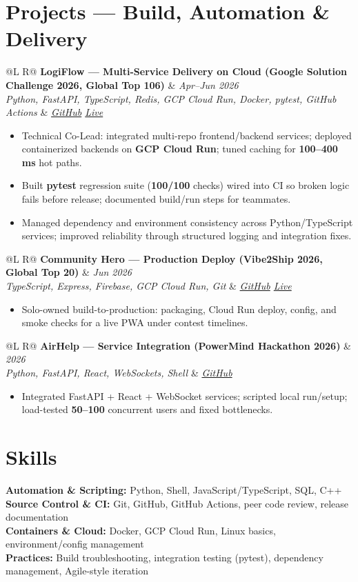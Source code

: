 \documentclass[a4paper,10pt]{article}
\makeatletter
\newcommand{\proj}[4]{%
  \vspace{1.5mm}
  \noindent\begin{tabularx}{\textwidth}{@{}L R@{}}
    \textbf{#1} & \textit{\small #2} \\
    \textit{\small #3} & \textit{\small #4} \\
  \end{tabularx}\par
  \vspace{0.5mm}%
}
\makeatother
\begin{document}
\section{Projects --- Build, Automation \& Delivery}
\proj{LogiFlow --- Multi-Service Delivery on Cloud (Google Solution Challenge 2026, Global Top 106)}{Apr--Jun 2026}
{Python, FastAPI, TypeScript, Redis, GCP Cloud Run, Docker, pytest, GitHub Actions}
{\href{https://github.com/Ojas-Srivastava05/LogiFlow-Solution-Challenge-2026}{GitHub} \textbar{} \href{https://logi-flow-solution-challenge-2026.vercel.app}{Live}}
\begin{itemize}
  \item Technical Co-Lead: integrated multi-repo frontend/backend services; deployed containerized backends on \textbf{GCP Cloud Run}; tuned caching for \textbf{100--400 ms} hot paths.
  \item Built \textbf{pytest} regression suite (\textbf{100/100} checks) wired into CI so broken logic fails before release; documented build/run steps for teammates.
  \item Managed dependency and environment consistency across Python/TypeScript services; improved reliability through structured logging and integration fixes.
\end{itemize}

\proj{Community Hero --- Production Deploy (Vibe2Ship 2026, Global Top 20)}{Jun 2026}
{TypeScript, Express, Firebase, GCP Cloud Run, Git}
{\href{https://github.com/Ojas-Srivastava05/community-hero}{GitHub} \textbar{} \href{https://community-hero-987477089222.asia-south1.run.app}{Live}}
\begin{itemize}
  \item Solo-owned build-to-production: packaging, Cloud Run deploy, config, and smoke checks for a live PWA under contest timelines.
\end{itemize}

\proj{AirHelp --- Service Integration (PowerMind Hackathon 2026)}{2026}
{Python, FastAPI, React, WebSockets, Shell}
{\href{https://github.com/Ojas-Srivastava05/AirHelp-AI-Airport-Assistant}{GitHub}}
\begin{itemize}
  \item Integrated FastAPI + React + WebSocket services; scripted local run/setup; load-tested \textbf{50--100} concurrent users and fixed bottlenecks.
\end{itemize}

\section{Skills}
\noindent\small
\textbf{Automation \& Scripting:} Python, Shell, JavaScript/TypeScript, SQL, C++ \\[0.6mm]
\textbf{Source Control \& CI:} Git, GitHub, GitHub Actions, peer code review, release documentation \\[0.6mm]
\textbf{Containers \& Cloud:} Docker, GCP Cloud Run, Linux basics, environment/config management \\[0.6mm]
\textbf{Practices:} Build troubleshooting, integration testing (pytest), dependency management, Agile-style iteration
\end{document}
